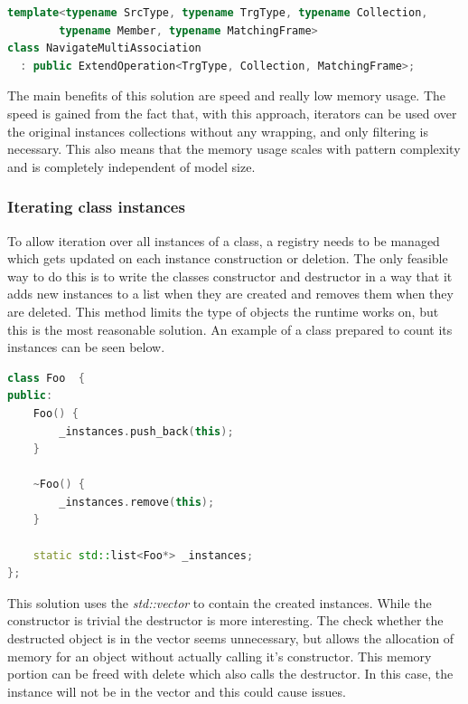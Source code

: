 \begin{lstlisting}[frame=single,float=!ht,language=C++,
label=listing:template_example, caption=Template based approach example]
template<typename SrcType, typename TrgType, typename Collection, 
		typename Member, typename MatchingFrame>
class NavigateMultiAssociation
  : public ExtendOperation<TrgType, Collection, MatchingFrame>;
\end{lstlisting}

The main benefits of this solution are speed and really low memory usage. The
speed is gained from the fact that, with this approach, iterators can be used
over the original instances collections without any wrapping, and only
filtering is necessary. This also means that the memory usage scales with
pattern complexity and is completely independent of model size.

\subsubsection{Iterating class instances}\label{sect:IteratingClassInstances}

To allow iteration over all instances of a class, a registry needs to be managed
which gets updated on each instance construction or deletion. The only feasible
way to do this is to write the classes constructor and destructor in a way that
it adds new instances to a list when they are created and removes them when they
are deleted. This method limits the type of objects the runtime works on, but
this is the most reasonable solution. An example of a class prepared to count
its instances can be seen below.

\begin{lstlisting}[frame=single,float=!ht,language=C++]
class Foo  {
public:
	Foo() {
		_instances.push_back(this);
	}
	
	~Foo() {
		_instances.remove(this);
	}
		
	static std::list<Foo*> _instances;
};
\end{lstlisting}

This solution uses the \emph{std::vector} to contain the created instances.
While the constructor is trivial the destructor is more interesting. The
check whether the destructed object is in the vector seems unnecessary, but \CPP{}
allows the allocation of memory for an object without actually calling it's
constructor. This memory portion can be freed with delete which also calls the
destructor. In this case, the instance will not be in the vector and this could
cause issues.

